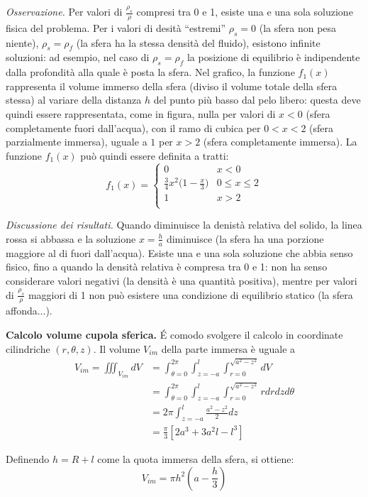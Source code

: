 \textit{Osservazione.} Per valori di $\frac{\rho_s}{\rho}$ compresi tra
 0 e 1, esiste una e una sola soluzione fisica del problema.
 Per i valori di desità
 ``estremi'' $\rho_s = 0$ (la sfera non pesa niente), $\rho_s = \rho_f$ (la sfera
 ha la stessa densità del fluido), esistono infinite soluzioni:
 ad esempio, nel caso di $\rho_s = \rho_f$ la posizione di equilibrio è indipendente
 dalla profondità alla quale è posta la sfera. Nel grafico, la funzione
 $f_1(x)$ rappresenta il volume immerso della sfera (diviso il volume totale
 della sfera stessa) al variare della 
 distanza $h$ del punto più basso dal pelo libero: questa deve quindi
 essere rappresentata, come in figura, nulla per valori di $x<0$ (sfera
 completamente fuori dall'acqua), con il ramo di cubica per $0<x<2$
 (sfera parzialmente immersa), uguale a $1$ per $x>2$ (sfera completamente
 immersa). La funzione $f_1(x)$ può quindi essere definita a tratti:
 \begin{equation}
  f_1(x) = 
 \begin{cases}
   0 &    x < 0 \\
   \frac{3}{4} x^2 \Big(1 - \frac{x}{3}\Big) &    0 \leq x \leq 2 \\
   1 &   x > 2 \\
 \end{cases}
 \end{equation}
\vspace{0.2cm}

\textit{Discussione dei risultati.} Quando diminuisce la denistà relativa
 del solido, la linea rossa si abbassa e la soluzione $x=\frac{h}{a}$
 diminuisce (la sfera ha una porzione maggiore al di fuori dall'acqua).
 Esiste una e una sola soluzione che abbia senso fisico, fino a quando
 la densità relativa è compresa tra 0 e 1: non ha senso considerare valori
 negativi (la densità è una quantità positiva), mentre per valori di
 $\frac{\rho_s}{\rho}$ maggiori di 1 non può esistere una condizione
 di equilibrio statico (la sfera affonda...).


\newpage
\textbf{Calcolo volume cupola sferica.} 
\'E comodo svolgere il calcolo in coordinate cilindriche $(r,\theta,z)$.
Il volume $V_{im}$ della parte immersa è uguale a 
\begin{equation}
\begin{aligned}
V_{im} = \iiint_{V_{im}} dV & = \int_{\theta=0}^{2\pi} \int_{z=-a}^{l} \int_{r=0}^{\sqrt{a^2-z^2}} dV \\
                & = \int_{\theta=0}^{2\pi} \int_{z=-a}^{l} \int_{r=0}^{\sqrt{a^2-z^2}} r dr dz d\theta \\
                & = 2\pi \int_{z=-a}^{l} \frac{a^2-z^2}{2} dz \\
                & = \frac{\pi}{3} [2 a^3 + 3 a^2 l - l^3]
\end{aligned}
\end{equation}

Definendo $h = R+l$ come la quota immersa della sfera, si ottiene:
\begin{equation}
V_{im} = \pi h^2 \displaystyle \left( a - \frac{h}{3} \right)
\end{equation}



